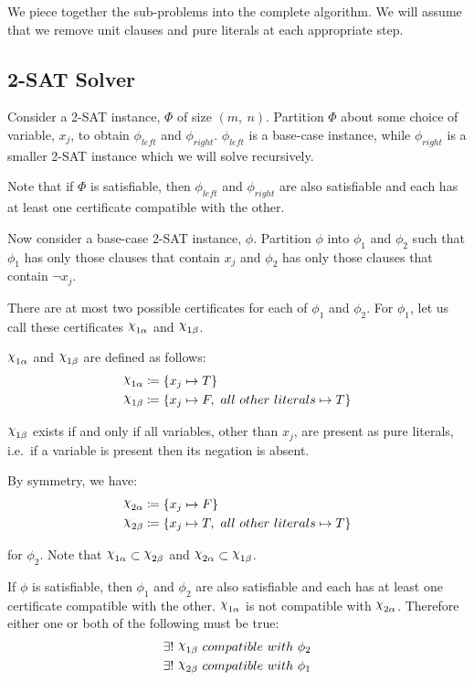We piece together the sub-problems into the complete algorithm.
We will assume that we remove unit clauses and pure literals at each appropriate step.


\subsection{2-SAT Solver}
\label{subsec:2-sat-solver}

Consider a 2-SAT instance, $\Phi$ of size $(m,~ n)$.
Partition $\Phi$ about some choice of variable, $x_j$, to obtain $\phi_{left}$ and $\phi_{right}$.
$\phi_{left}$ is a base-case instance, while $\phi_{right}$ is a smaller 2-SAT instance which we will solve recursively.

Note that if $\Phi$ is satisfiable, then $\phi_{left}$ and $\phi_{right}$ are also satisfiable and each has at least one certificate compatible with the other.

Now consider a base-case 2-SAT instance, $\phi$.
Partition $\phi$ into $\phi_1$ and $\phi_2$ such that $\phi_1$ has only those clauses that contain $x_j$ and $\phi_2$ has only those clauses that contain $\lnot x_j$.

There are at most two possible certificates for each of $\phi_1$ and $\phi_2$.
For $\phi_1$, let us call these certificates $\rchi_{1\alpha}$ and $\rchi_{1\beta}$.

$\rchi_{1\alpha}$ and $\rchi_{1\beta}$ are defined as follows:
\begin{align*}
    \rchi_{1\alpha} & \coloneqq \{ x_j \mapsto T \} \\
    \rchi_{1\beta} & \coloneqq \{ x_j \mapsto F,~ all~ other~ literals \mapsto T \}
\end{align*}

$\rchi_{1\beta}$ exists if and only if all variables, other than $x_j$, are present as pure literals, i.e.\ if a variable is present then its negation is absent.

By symmetry, we have:
\begin{align*}
    \rchi_{2\alpha} & \coloneqq \{ x_j \mapsto F \} \\
    \rchi_{2\beta} & \coloneqq \{ x_j \mapsto T,~ all~ other~ literals \mapsto T \}
\end{align*}

for $\phi_2$.
Note that $\rchi_{1\alpha} \subset \rchi_{2\beta}$ and $\rchi_{2\alpha} \subset \rchi_{1\beta}$.

If $\phi$ is satisfiable, then $\phi_1$ and $\phi_2$ are also satisfiable and each has at least one certificate compatible with the other.
$\rchi_{1\alpha}$ is not compatible with $\rchi_{2\alpha}$.
Therefore either one or both of the following must be true:
\begin{align*}
    \exists !~ & \rchi_{1\beta}~ compatible~ with~ \phi_2 \\
    \exists !~ & \rchi_{2\beta}~ compatible~ with~ \phi_1
\end{align*}

